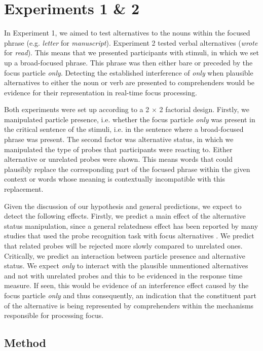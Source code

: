 \documentclass[output=paper,colorlinks,citecolor=brown]{langscibook}
\begin{document}
\section{Experiments 1 \& 2} 

In Experiment 1, we aimed to test alternatives to the nouns within the focused phrase (e.g. \textit{letter} for \textit{manuscript}). Experiment 2 tested verbal alternatives (\textit{wrote} for \textit{read}). This means that we presented participants with stimuli, in which we set up a broad-focused phrase. This phrase was then either bare or preceded by the focus particle \textit{only}. Detecting the established interference of \textit{only} when plausible alternatives to either the noun or verb are presented to comprehenders would be evidence for their representation in real-time focus processing.

Both experiments were set up according to a 2 $\times$ 2 factorial design. Firstly, we manipulated particle presence, i.e. whether the focus particle \textit{only} was present in the critical sentence of the stimuli, i.e. in the sentence where a broad-focused phrase was present. The second factor was alternative status, in which we manipulated the type of probes that participants were reacting to. Either alternative or unrelated probes were shown. This means words that could plausibly replace the corresponding part of the focused phrase within the given context or words whose meaning is contextually incompatible with this replacement.

Given the discussion of our hypothesis and general predictions, we expect to detect the following effects. Firstly, we predict a main effect of the alternative status manipulation, since a general relatedness effect has been reported by many studies that used the probe recognition task with focus alternatives \citep{gotzner2016impact,jordens2020role}. We predict that related probes will be rejected more slowly compared to unrelated ones. Critically, we predict an interaction between particle presence and alternative status. We expect \textit{only} to interact with the plausible unmentioned alternatives and not with unrelated probes and this to be evidenced in the response time measure. If seen, this would be evidence of an interference effect caused by the focus particle \textit{only} and thus consequently, an indication that the constituent part of the alternative is being represented by comprehenders within the mechanisms responsible for processing focus.

\subsection{Method}
\end{document}
